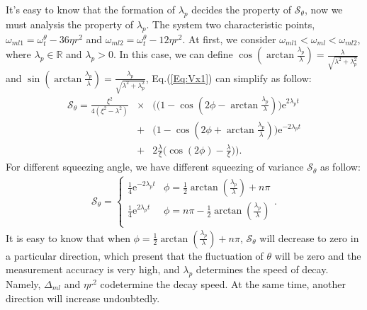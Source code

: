 \documentclass[pra,aps,superscriptaddress,showpacs,preprint]{revtex4}%
\begin{document}
It's easy to know that the formation of $\lambda_{p}$ decides the property of $\mathcal{S}_{\theta}$, now we must analysis the
property of $\lambda_{p}$. The system two characteristic points, $\omega_{ml1}=\omega_{t}^{\theta}-36\eta r^{2}$ and $\omega_{ml2}=\omega_{t}^{\theta}-12\eta r^{2}$.
At first, we consider $\omega_{ml1}<\omega_{ml}<\omega_{ml2}$, where $\lambda_{p}\in\mathbb{R}$ and $\lambda_{p}>0$. In this case, we can define $\cos(\arctan\frac{\lambda_{p}}{\lambda})=\frac{\lambda}{\sqrt{\lambda^{2}+\lambda_{p}^{2}}}$ and $\sin(\arctan\frac{\lambda_{p}}{\lambda})=\frac{\lambda_{p}}{\sqrt{\lambda^{2}+\lambda_{p}^{2}}}$, Eq.(\ref{Eq:Vx1}) can simplify as follow:
\begin{eqnarray}
\mathcal{S}_{\theta}=\frac{\xi^{2}}{4(\xi^{2}-\lambda^{2})}
&\times&\Big( \big(1\!-\!\cos(2\phi-\arctan\frac{\lambda_{p}}{\lambda})\big)\mathrm{e}^{2\lambda_{p}t}\nonumber\\
&+&\big(1\!-\!\cos(2\phi+\arctan\frac{\lambda_{p}}{\lambda})\big)\mathrm{e}^{-2\lambda_{p}t}\nonumber\\
&+&2\frac{\lambda}{\xi}\big(\cos(2\phi)-\frac{\lambda}{\xi}\big)\Big)
\label{Eq:simplify squeezing rate 1}.
\end{eqnarray}
 For different squeezing angle, we have different squeezing of variance $\mathcal{S}_{\theta}$ as follow:
 \begin{eqnarray}
 \mathcal{S}_{\theta}=
\begin{cases}
\frac{1}{4}\mathrm{e}^{-2\lambda_{p}t} & \phi=\frac{1}{2}\arctan(\frac{\lambda_{p}}{\lambda})+n\pi\\
\frac{1}{4}\mathrm{e}^{2\lambda_{p}t}  & \phi=n\pi-\frac{1}{2}\arctan(\frac{\lambda_{p}}{\lambda})\\
\end{cases}
\label{Eq:decay and rising squeezing rate }.
\end{eqnarray}
It is easy to know that when $\phi=\frac{1}{2}\arctan(\frac{\lambda_{p}}{\lambda})+n\pi$, $\mathcal{S}_{\theta}$ will decrease to zero in a particular direction, which present that the fluctuation of $\theta$ will be zero and the measurement accuracy is very high, and $\lambda_{p}$ determines the speed of decay. Namely, $\Delta_{ml}$ and $\eta r^{2}$ codetermine the decay speed. At the same time, another direction will increase undoubtedly.
\end{document}
